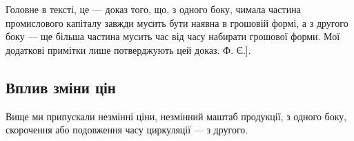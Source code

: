 Головне в тексті, це — доказ того, що, з одного боку, чимала частина
промислового капіталу завжди мусить бути наявна в грошовій формі,
а з другого боку — ще більша частина мусить час від часу набирати
грошової форми. Мої додаткові примітки лише потверджують цей доказ. Ф. Є.].

\subsection{Вплив зміни цін}

Вище ми припускали незмінні ціни, незмінний маштаб продукції, з
одного боку, скорочення або подовження часу циркуляції — з другого.
\parbreak{}  %

